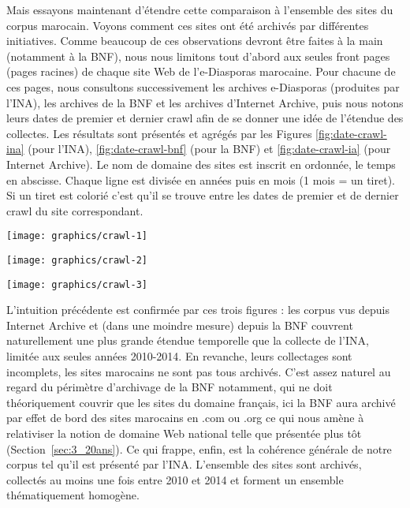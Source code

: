 \documentclass[symmetric,justified,marginals=raggedouter]{tufte-book}
\begin{document}
\noindent Mais essayons maintenant d'étendre cette comparaison à l'ensemble des sites du corpus marocain. Voyons comment ces sites ont été archivés par différentes initiatives. Comme beaucoup de ces observations devront être faites à la main (notamment à la BNF), nous nous limitons tout d'abord aux seules front pages (pages racines) de chaque site Web de l'e-Diasporas marocaine. Pour chacune de ces pages, nous consultons successivement les archives e-Diasporas (produites par l'INA), les archives de la BNF et les archives d'Internet Archive, puis nous notons leurs dates de premier et dernier crawl afin de se donner une idée de l'étendue des collectes. Les résultats sont présentés et agrégés par les Figures \ref{fig:date-crawl-ina} (pour l'INA), \ref{fig:date-crawl-bnf} (pour la BNF) et \ref{fig:date-crawl-ia} (pour Internet Archive). Le nom de domaine des sites est inscrit en ordonnée, le temps en abscisse. Chaque ligne est divisée en années puis en mois (1 mois = un tiret). Si un tiret est colorié c'est qu'il se trouve entre les dates de premier et de dernier crawl du site correspondant.


\begin{figure*}[hbtp]%
  \texttt{[image: graphics/crawl-1]}
  \caption{Préservation dans le temps des sites de l'e-Diaspora marocaine par l'INA (tirets jaunes)}
  \label{fig:date-crawl-ina}
\end{figure*}


\begin{figure*}[hbtp]%
  \texttt{[image: graphics/crawl-2]}
  \caption{Préservation dans le temps des sites de l'e-Diaspora marocaine par la BNF (tirets rouges)}
  \label{fig:date-crawl-bnf}
\end{figure*}

\begin{figure*}[hbtp]%
  \texttt{[image: graphics/crawl-3]}
  \caption{Préservation dans le temps des sites de l'e-Diaspora marocaine par Internet Archive (tirets bleus)}
  \label{fig:date-crawl-ia}
\end{figure*}


L'intuition précédente est confirmée par ces trois figures : les corpus vus depuis Internet Archive et (dans une moindre mesure) depuis la BNF couvrent naturellement une plus grande étendue temporelle que la collecte de l'INA, limitée aux seules années 2010-2014. En revanche, leurs collectages sont incomplets, les sites marocains ne sont pas tous archivés. C'est assez naturel au regard du périmètre d'archivage de la BNF notamment, qui ne doit théoriquement couvrir que les sites du domaine français, ici la BNF aura archivé par effet de bord des sites marocains en .com ou .org ce qui nous amène à relativiser la notion de domaine Web national telle que présentée plus tôt (Section~\ref{sec:3_20ans}). Ce qui frappe, enfin, est la cohérence générale de notre corpus tel qu'il est présenté par l'INA. L'ensemble des sites sont archivés, collectés au moins une fois entre 2010 et 2014 et forment un ensemble thématiquement homogène. 
\end{document}
